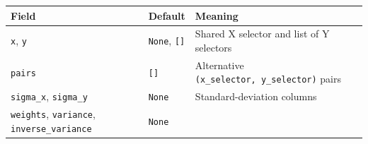 \documentclass[
  10pt,
  a4paper,
  oneside]{scrreprt}
\begin{document}
\begin{longtable}[]{@{}lll@{}}
\toprule
\begin{minipage}[b]{0.30\columnwidth}\raggedright
Field\strut
\end{minipage} & \begin{minipage}[b]{0.30\columnwidth}\raggedright
Default\strut
\end{minipage} & \begin{minipage}[b]{0.30\columnwidth}\raggedright
Meaning\strut
\end{minipage}\tabularnewline
\midrule
\endhead
\begin{minipage}[t]{0.30\columnwidth}\raggedright
\texttt{x}, \texttt{y}\strut
\end{minipage} & \begin{minipage}[t]{0.30\columnwidth}\raggedright
\texttt{None}, \texttt{{[}{]}}\strut
\end{minipage} & \begin{minipage}[t]{0.30\columnwidth}\raggedright
Shared X selector and list of Y selectors\strut
\end{minipage}\tabularnewline
\begin{minipage}[t]{0.30\columnwidth}\raggedright
\texttt{pairs}\strut
\end{minipage} & \begin{minipage}[t]{0.30\columnwidth}\raggedright
\texttt{{[}{]}}\strut
\end{minipage} & \begin{minipage}[t]{0.30\columnwidth}\raggedright
Alternative \texttt{(x\_selector,\ y\_selector)} pairs\strut
\end{minipage}\tabularnewline
\begin{minipage}[t]{0.30\columnwidth}\raggedright
\texttt{sigma\_x}, \texttt{sigma\_y}\strut
\end{minipage} & \begin{minipage}[t]{0.30\columnwidth}\raggedright
\texttt{None}\strut
\end{minipage} & \begin{minipage}[t]{0.30\columnwidth}\raggedright
Standard-deviation columns\strut
\end{minipage}\tabularnewline
\begin{minipage}[t]{0.30\columnwidth}\raggedright
\texttt{weights}, \texttt{variance}, \texttt{inverse\_variance}\strut
\end{minipage} & \begin{minipage}[t]{0.30\columnwidth}\raggedright
\texttt{None}\strut
\end{minipage} & \begin{minipage}[t]{0.30\columnwidth}\raggedright

\end{minipage}
\end{longtable}
\end{document}
